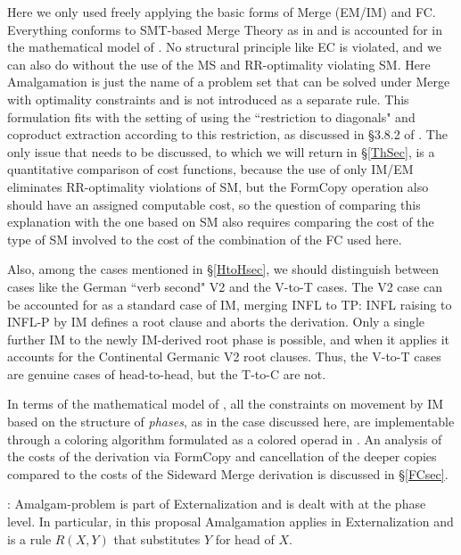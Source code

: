 \documentclass[12pt]{amsart}
\numberwithin{equation}{section}
\begin{document}
\smallskip
 
Here we only used freely applying the basic forms of Merge (EM/IM) and FC. Everything 
conforms to SMT-based Merge Theory as in \cite{ChomskyElements} and is accounted for in 
the mathematical model of \cite{MCB}. No structural principle like EC is violated, and we can also
do without the use of the MS and RR-optimality violating SM.   
Here Amalgamation is just the name of a problem set that can be solved under Merge with optimality 
constraints and is not introduced as a separate rule.  This formulation fits with the setting of \cite{MCB}
using the ``restriction to diagonals" and coproduct extraction according to this restriction, as discussed
in \S 3.8.2 of \cite{MCB}. The only issue that needs to be discussed, to which we will
return in \S \ref{ThSec}, is a quantitative comparison of cost functions, because the use of
only IM/EM eliminates RR-optimality violations of SM, but the FormCopy operation also should 
have an assigned computable cost, so the question of comparing this explanation with
the one based on SM also requires comparing the cost of the type of SM 
involved to the cost of the combination of the FC used here.

Also, among the cases mentioned in \S \ref{HtoHsec}, we should distinguish between
cases like the German ``verb second" V2 and the V-to-T cases. The V2 case can be accounted
for as a standard case of IM, merging INFL to TP: INFL raising to INFL-P by IM defines a root clause and aborts the derivation. Only a single further IM to the newly IM-derived root phase is possible, and when it applies it accounts for the 
Continental Germanic V2 root clauses. Thus, the V-to-T cases are genuine cases of head-to-head, but the T-to-C
are not. 

\smallskip

In terms of the mathematical model of \cite{MCB}, all the constraints on movement by IM based on the
structure of {\em phases}, as in the case discussed here, are implementable through a coloring algorithm 
formulated as a colored operad in \cite{MHL}.  An analysis of the costs of the derivation via FormCopy and
cancellation of the deeper copies compared to the costs of the Sideward Merge derivation is discussed in \S \ref{FCsec}.
 

\medskip

: Amalgam-problem is part of Externalization and is dealt 
with at the phase level. In particular, in this proposal 
Amalgamation applies in Externalization and is a rule 
$R(X,Y)$ that substitutes $Y$ for head of  $X$.  
\end{document}
